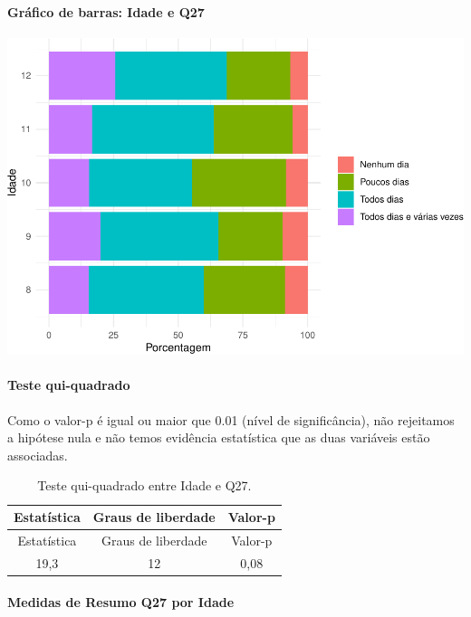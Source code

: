 \documentclass[]{article}
\let\oldparagraph\paragraph
\renewcommand{\paragraph}[1]{\oldparagraph{#1}\mbox{}}
\begin{document}
\hypertarget{gruxe1fico-de-barras-idade-e-q27}{%
\paragraph{Gráfico de barras: Idade e Q27}\label{gruxe1fico-de-barras-idade-e-q27}}

\begin{center}\includegraphics[width=0.75\linewidth]{relatorio_covid19_files/figure-latex/unnamed-chunk-801-1} \end{center}

\hypertarget{teste-qui-quadrado-69}{%
\paragraph{Teste qui-quadrado}\label{teste-qui-quadrado-69}}

Como o valor-p é igual ou maior que 0.01 (nível de significância), não rejeitamos a hipótese nula e não temos evidência estatística que as duas variáveis estão associadas.

\begin{longtable}[]{@{}ccc@{}}
\caption{\label{tab:unnamed-chunk-803}Teste qui-quadrado entre Idade e Q27.}\tabularnewline
\toprule
Estatística & Graus de liberdade & Valor-p\tabularnewline
\midrule
\endfirsthead
\toprule
Estatística & Graus de liberdade & Valor-p\tabularnewline
\midrule
\endhead
19,3 & 12 & 0,08\tabularnewline
\bottomrule
\end{longtable}

\cleardoublepage

\hypertarget{medidas-de-resumo-q27-por-idade}{%
\paragraph{Medidas de Resumo Q27 por Idade}\label{medidas-de-resumo-q27-por-idade}}
\end{document}
